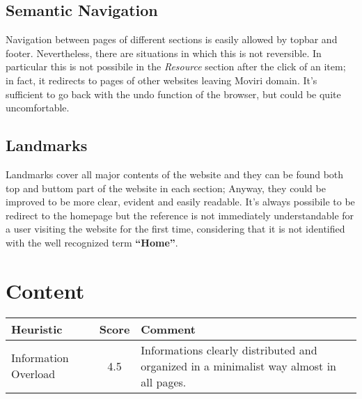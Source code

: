 \begin{comment}
Navigation along each page is easily feasible and understandable. Structural navigation change slightly between section.\\
For instance, in the \textit{Business Lines} section each topic is represented by the combination of image and description side by side and unpaired with respect to the next one.
While in the \textit{Resource} section each item is placed in a grid with its title and a respective image.  
\end{comment}


\subsection{Semantic Navigation}
Navigation between pages of different sections is easily allowed by topbar and footer. Nevertheless, there are situations in which this is not reversible. In particular this is not possibile in the \textit{Resource} section after the click of an item; in fact, it redirects to pages of other websites leaving Moviri domain. It's sufficient to go back with the undo function of the browser, but could be quite uncomfortable.
\subsection{Landmarks}
Landmarks cover all major contents of the website and they can be found both top and buttom part of the website in each section; Anyway, they could be improved to be more clear, evident and easily readable. It’s always possibile to be redirect to the homepage but the reference is not immediately understandable for a user visiting the website for the first time, considering that it is not identified with the well recognized term \textbf{“Home”}.


\section{Content}
\begin{table}[H]
  \begin{center}
    \label{tab:table1}
    \begin{tabular}{||l|c|p{8cm}||} %
      \textbf{Heuristic} & \textbf{Score} & \textbf{Comment}\\
      
      \hline
     Information Overload & 4.5 & Informations clearly distributed and organized in a minimalist way almost in all pages.\\
     
    \end{tabular}
  \end{center}
\end{table}
